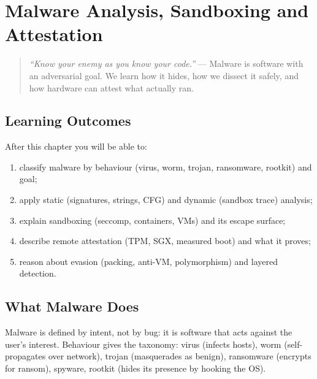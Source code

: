 \chapter{Malware Analysis, Sandboxing and Attestation}
\label{ch:malware}

\begin{quote}
\emph{``Know your enemy as you know your code.''} --- Malware is software with an adversarial goal. We learn how it hides, how we dissect it safely, and how hardware can attest what actually ran.
\end{quote}

\noindent{}
\vspace{0.4em}

\section*{Learning Outcomes}
After this chapter you will be able to:
\begin{enumerate}[label=(L\arabic*)]
    \item classify malware by behaviour (virus, worm, trojan, ransomware, rootkit) and goal;
    \item apply static (signatures, strings, CFG) and dynamic (sandbox trace) analysis;
    \item explain sandboxing (seccomp, containers, VMs) and its escape surface;
    \item describe remote attestation (TPM, SGX, measured boot) and what it proves;
    \item reason about evasion (packing, anti-VM, polymorphism) and layered detection.
\end{enumerate}

\section{What Malware Does}
\label{sec:malware-types}
Malware is defined by intent, not by bug: it is software that acts against the user's interest. Behaviour gives the taxonomy: virus (infects hosts), worm (self-propagates over network), trojan (masquerades as benign), ransomware (encrypts for ransom), spyware, rootkit (hides its presence by hooking the OS).

